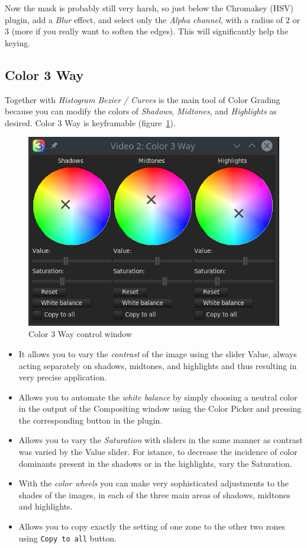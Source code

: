 Now the mask is probably still very harsh, so just below the Chromakey (HSV) plugin, add a \textit{Blur} effect, and select only the \textit{Alpha channel}, with a radius of $2$ or $3$ (more if you really want to soften the edges). This will significantly help the keying.

\subsection{Color 3 Way}%
\label{sub:color_3_way}

Together with \textit{Histogram Bezier / Curves} is the main tool of Color Grading because you can modify the colors of \textit{Shadows}, \textit{Midtones}, and \textit{Highlights} as desired. Color 3 Way is keyframable (figure~\ref{fig:color3way}).

\begin{figure}[htpb]
    \centering
    \includegraphics[width=0.8\linewidth]{images/color3way.png}
    \caption{Color 3 Way control window}
    \label{fig:color3way}
\end{figure}

\begin{itemize}
    \item It allows you to vary the \textit{contrast} of the image using the slider Value, always acting separately on shadows, midtones, and highlights and thus resulting in very precise application.
    \item Allows you to automate the \textit{white balance} by simply choosing a neutral color in the output of the Compositing window using the Color Picker and pressing the corresponding button in the plugin.
    \item Allows you to vary the \textit{Saturation} with sliders in the same manner as contrast was varied by the Value slider. For istance, to decrease the incidence of color dominants present in the shadows or in the highlights, vary the Saturation.
    \item With the \textit{color wheels} you can make very sophisticated adjustments to the shades of the images, in each of the three main areas of shadows, midtones and highlights.
    \item Allows you to copy exactly the setting of one zone to the other two zones using \texttt{Copy to all} button.
\end{itemize}

